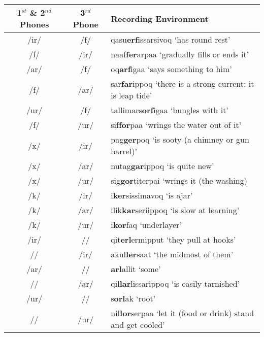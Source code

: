 \documentclass[12pt]{article}
\begin{document}
	\begin{tabular}{|c|c|l|}
	\hline
	\makecell[l]{1$^{st}$ \& 2$^{nd}$ \\ Phones} & 3$^{rd}$ Phone & Recording Environment \\
	\hline
	/ir/ & /f/ & qasu\textbf{erf}issarsivoq `has round rest'\\
	/f/ & /ir/ & naaf\textbf{fer}arpaa `gradually fills or ends it'\\
	/ar/ & /f/ & oq\textbf{arf}igaa `says something to him'\\
	/f/ & /ar/ & sar\textbf{far}ippoq `there is a strong current; it is leap tide'\\
	/ur/ & /f/ & tallimars\textbf{orf}igaa `bungles with it'\\
	/f/ & /ur/ & sif\textbf{for}paa `wrings the water out of it'\\
	/x/ & /ir/ & pag\textbf{ger}poq `is sooty (a chimney or gun barrel)'\\
	/x/ & /ar/ & nutag\textbf{gar}ippoq `is quite new'\\
	/x/ & /ur/ & sig\textbf{gor}titerpai `wrings it (the washing)\\
	/k/ & /ir/ & i\textbf{ker}sissimavoq `is ajar'\\
	/k/ & /ar/ & ilik\textbf{kar}seriippoq `is slow at learning'\\
	/k/ & /ur/ & i\textbf{kor}faq `underlayer'\\
	/ir/ & /\textbeltl/ & qit\textbf{erl}ermipput `they pull at hooks'\\
	/\textbeltl/ & /ir/ & akul\textbf{ler}saat `the midmost of them'\\
	/ar/ & /\textbeltl/ & \textbf{arl}allit `some' \\
	/\textbeltl/ & /ar/ & qil\textbf{lar}lissarippoq `is easily tarnished' \\
	/ur/ & /\textbeltl/ & s\textbf{orl}ak `root' \\
	/\textbeltl/ & /ur/ & nil\textbf{lor}serpaa `let it (food or drink) stand and get cooled' \\
	\hline
	\end{tabular}
	\newpage
\end{document}
